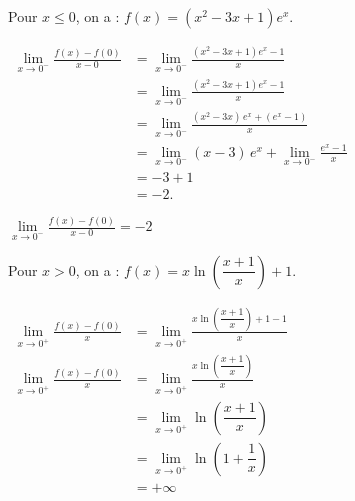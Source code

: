 \documentclass[12pt,a4paper]{article}
\begin{document}
\begin{enumerate}
\begin{enumerate}
                    Pour \( x \leq 0 \), on a : \( f(x) = (x^2 - 3x + 1) e^x. \)

                    \(
                    \begin{aligned}
                        \lim\limits_{x \to 0^-}\frac{f(x)-f(0)}{x-0} & = \lim\limits_{x \to 0^-}\frac{(x^2 - 3x + 1) e^x-1}{x}                             \\
                                                                     & = \lim\limits_{x \to 0^-}\frac{(x^2 - 3x + 1) e^x-1}{x}                             \\
                                                                     & = \lim\limits_{x \to 0^-} \frac{(x^2 - 3x)\, e^x + (e^x - 1)}{x}                    \\
                                                                     & = \lim\limits_{x \to 0^-} (x - 3)\, e^x + \lim\limits_{x \to 0^-} \frac{e^x - 1}{x} \\
                                                                     & = -3 + 1                                                                            \\
                                                                     & = -2.
                    \end{aligned}
                    \)

                    \(\lim\limits_{x \to 0^-}\frac{f(x)-f(0)}{x-0}=-2\)

                    Pour \( x > 0 \), on a : \(f(x) = x \ln\left( \dfrac{x+1}{x} \right) + 1.\)

                    \(
                    \begin{aligned}
                        \lim\limits_{x \to 0^+} \frac{f(x) - f(0)}{x} & = \lim\limits_{x \to 0^+} \frac{x \ln\left( \dfrac{x+1}{x} \right)+1-1}{x} \\
                        \lim\limits_{x \to 0^+} \frac{f(x) - f(0)}{x} & = \lim\limits_{x \to 0^+} \frac{x \ln\left( \dfrac{x+1}{x} \right)}{x}     \\
                                                                      & = \lim\limits_{x \to 0^+} \ln\left( \dfrac{x+1}{x} \right)                 \\
                                                                      & = \lim\limits_{x \to 0^+} \ln\left( 1 + \dfrac{1}{x} \right)               \\
                                                                      & = +\infty
                    \end{aligned}
                    \)


\end{enumerate}
\end{enumerate}
\end{document}
